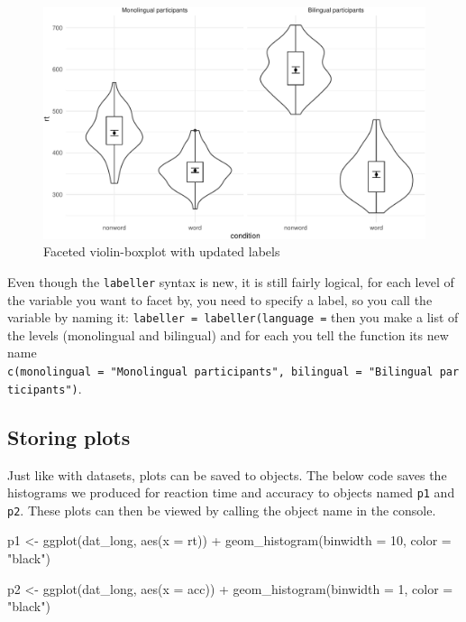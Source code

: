 \documentclass[
  english,
  doc,floatsintext]{apa6}
\newenvironment{Shaded}{\begin{snugshade}}{\end{snugshade}}
\newcommand{\AttributeTok}[1]{\textcolor[rgb]{0.77,0.63,0.00}{#1}}
\newcommand{\DecValTok}[1]{\textcolor[rgb]{0.00,0.00,0.81}{#1}}
\newcommand{\FunctionTok}[1]{\textcolor[rgb]{0.00,0.00,0.00}{#1}}
\newcommand{\NormalTok}[1]{#1}
\newcommand{\OtherTok}[1]{\textcolor[rgb]{0.56,0.35,0.01}{#1}}
\newcommand{\SpecialCharTok}[1]{\textcolor[rgb]{0.00,0.00,0.00}{#1}}
\newcommand{\StringTok}[1]{\textcolor[rgb]{0.31,0.60,0.02}{#1}}
\begin{document}
\begin{figure}

{\centering \includegraphics[width=1\linewidth]{images/violin-facet-1} 

}

\caption{Faceted violin-boxplot with updated labels}\label{fig:violin-facet}
\end{figure}

Even though the \texttt{labeller} syntax is new, it is still fairly logical, for each level of the variable you want to facet by, you need to specify a label, so you call the variable by naming it: \texttt{labeller\ =\ labeller(language\ =} then you make a list of the levels (monolingual and bilingual) and for each you tell the function its new name \texttt{c(monolingual\ =\ "Monolingual\ participants",\ bilingual\ =\ "Bilingual\ participants")}.

\hypertarget{storing-plots}{%
\subsection{Storing plots}\label{storing-plots}}

Just like with datasets, plots can be saved to objects. The below code saves the histograms we produced for reaction time and accuracy to objects named \texttt{p1} and \texttt{p2}. These plots can then be viewed by calling the object name in the console.

\begin{Shaded}
\begin{Highlighting}[]
\NormalTok{p1 }\OtherTok{\textless{}{-}} \FunctionTok{ggplot}\NormalTok{(dat\_long, }\FunctionTok{aes}\NormalTok{(}\AttributeTok{x =}\NormalTok{ rt)) }\SpecialCharTok{+}
  \FunctionTok{geom\_histogram}\NormalTok{(}\AttributeTok{binwidth =} \DecValTok{10}\NormalTok{, }\AttributeTok{color =} \StringTok{"black"}\NormalTok{)}

\NormalTok{p2 }\OtherTok{\textless{}{-}} \FunctionTok{ggplot}\NormalTok{(dat\_long, }\FunctionTok{aes}\NormalTok{(}\AttributeTok{x =}\NormalTok{ acc)) }\SpecialCharTok{+}
  \FunctionTok{geom\_histogram}\NormalTok{(}\AttributeTok{binwidth =} \DecValTok{1}\NormalTok{, }\AttributeTok{color =} \StringTok{"black"}\NormalTok{) }
\end{Highlighting}
\end{Shaded}
\end{document}
